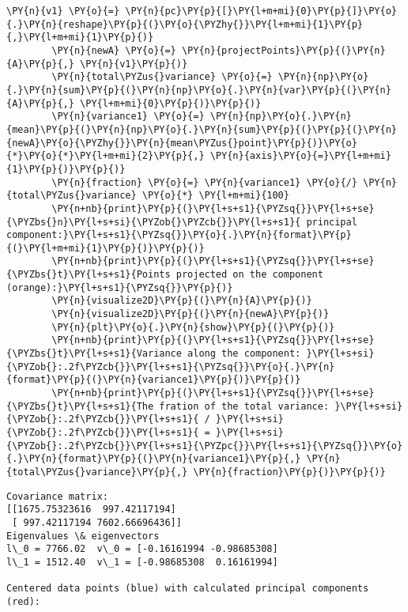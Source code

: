 \begin{Verbatim}[commandchars=\\\{\}]
        \PY{n}{v1} \PY{o}{=} \PY{n}{pc}\PY{p}{[}\PY{l+m+mi}{0}\PY{p}{]}\PY{o}{.}\PY{n}{reshape}\PY{p}{(}\PY{o}{\PYZhy{}}\PY{l+m+mi}{1}\PY{p}{,}\PY{l+m+mi}{1}\PY{p}{)}
        \PY{n}{newA} \PY{o}{=} \PY{n}{projectPoints}\PY{p}{(}\PY{n}{A}\PY{p}{,} \PY{n}{v1}\PY{p}{)}
        \PY{n}{total\PYZus{}variance} \PY{o}{=} \PY{n}{np}\PY{o}{.}\PY{n}{sum}\PY{p}{(}\PY{n}{np}\PY{o}{.}\PY{n}{var}\PY{p}{(}\PY{n}{A}\PY{p}{,} \PY{l+m+mi}{0}\PY{p}{)}\PY{p}{)}
        \PY{n}{variance1} \PY{o}{=} \PY{n}{np}\PY{o}{.}\PY{n}{mean}\PY{p}{(}\PY{n}{np}\PY{o}{.}\PY{n}{sum}\PY{p}{(}\PY{p}{(}\PY{n}{newA}\PY{o}{\PYZhy{}}\PY{n}{mean\PYZus{}point}\PY{p}{)}\PY{o}{*}\PY{o}{*}\PY{l+m+mi}{2}\PY{p}{,} \PY{n}{axis}\PY{o}{=}\PY{l+m+mi}{1}\PY{p}{)}\PY{p}{)}
        \PY{n}{fraction} \PY{o}{=} \PY{n}{variance1} \PY{o}{/} \PY{n}{total\PYZus{}variance} \PY{o}{*} \PY{l+m+mi}{100}
        \PY{n+nb}{print}\PY{p}{(}\PY{l+s+s1}{\PYZsq{}}\PY{l+s+se}{\PYZbs{}n}\PY{l+s+si}{\PYZob{}\PYZcb{}}\PY{l+s+s1}{ principal component:}\PY{l+s+s1}{\PYZsq{}}\PY{o}{.}\PY{n}{format}\PY{p}{(}\PY{l+m+mi}{1}\PY{p}{)}\PY{p}{)}
        \PY{n+nb}{print}\PY{p}{(}\PY{l+s+s1}{\PYZsq{}}\PY{l+s+se}{\PYZbs{}t}\PY{l+s+s1}{Points projected on the component (orange):}\PY{l+s+s1}{\PYZsq{}}\PY{p}{)}
        \PY{n}{visualize2D}\PY{p}{(}\PY{n}{A}\PY{p}{)}
        \PY{n}{visualize2D}\PY{p}{(}\PY{n}{newA}\PY{p}{)}
        \PY{n}{plt}\PY{o}{.}\PY{n}{show}\PY{p}{(}\PY{p}{)}
        \PY{n+nb}{print}\PY{p}{(}\PY{l+s+s1}{\PYZsq{}}\PY{l+s+se}{\PYZbs{}t}\PY{l+s+s1}{Variance along the component: }\PY{l+s+si}{\PYZob{}:.2f\PYZcb{}}\PY{l+s+s1}{\PYZsq{}}\PY{o}{.}\PY{n}{format}\PY{p}{(}\PY{n}{variance1}\PY{p}{)}\PY{p}{)}
        \PY{n+nb}{print}\PY{p}{(}\PY{l+s+s1}{\PYZsq{}}\PY{l+s+se}{\PYZbs{}t}\PY{l+s+s1}{The fration of the total variance: }\PY{l+s+si}{\PYZob{}:.2f\PYZcb{}}\PY{l+s+s1}{ / }\PY{l+s+si}{\PYZob{}:.2f\PYZcb{}}\PY{l+s+s1}{ = }\PY{l+s+si}{\PYZob{}:.2f\PYZcb{}}\PY{l+s+s1}{\PYZpc{}}\PY{l+s+s1}{\PYZsq{}}\PY{o}{.}\PY{n}{format}\PY{p}{(}\PY{n}{variance1}\PY{p}{,} \PY{n}{total\PYZus{}variance}\PY{p}{,} \PY{n}{fraction}\PY{p}{)}\PY{p}{)}
\end{Verbatim}

    \begin{Verbatim}[commandchars=\\\{\}]
Covariance matrix:
[[1675.75323616  997.42117194]
 [ 997.42117194 7602.66696436]]
Eigenvalues \& eigenvectors
l\_0 = 7766.02	v\_0 = [-0.16161994 -0.98685308]
l\_1 = 1512.40	v\_1 = [-0.98685308  0.16161994]

Centered data points (blue) with calculated principal components (red):

    \end{Verbatim}

